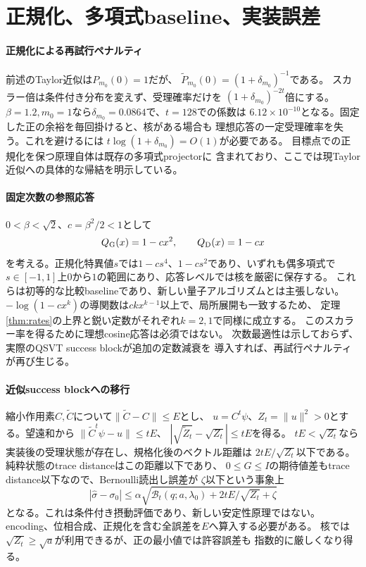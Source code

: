 \section{正規化、多項式baseline、実装誤差}\label{sec:normalization}
\paragraph{正規化による再試行ペナルティ}
前述のTaylor近似は$P_{m_0}(0)=1$だが、
$\widetilde P_{m_0}(0)=(1+\delta_{m_0})^{-1}$である。
スカラー倍は条件付き分布を変えず、受理確率だけを
$(1+\delta_{m_0})^{-2t}$倍にする。
$\beta=1.2,m_0=1$なら$\delta_{m_0}=0.0864$で、$t=128$での係数は
$6.12\times10^{-10}$となる。固定した正の余裕を毎回掛けると、核がある場合も
理想応答の一定受理確率を失う。これを避けるには
$t\log(1+\delta_{m_0})=O(1)$が必要である。
目標点での正規化を保つ原理自体は既存の多項式projector\cite{LinTongFilter}に
含まれており、ここでは現Taylor近似への具体的な帰結を明示している。

\paragraph{固定次数の参照応答}
$0<\beta<\sqrt2$、$c=\beta^2/2<1$として
\[
 Q_{\rm G}(x)=1-cx^2,\qquad Q_{\rm D}(x)=1-cx
\]
を考える。正規化特異値$s$では$1-cs^4$、$1-cs^2$であり、いずれも偶多項式で
$s\in[-1,1]$上$0$から$1$の範囲にあり、応答レベルでは核を厳密に保存する。
これらは初等的な比較baselineであり、新しい量子アルゴリズムとは主張しない。
$-\log(1-cx^k)$の導関数は$ckx^{k-1}$以上で、局所展開も一致するため、
定理\ref{thm:rates}の上界と鋭い定数がそれぞれ$k=2,1$で同様に成立する。
このスカラー率を得るために理想cosine応答は必須ではない。
次数最適性は示しておらず、実際のQSVT success blockが追加の定数減衰を
導入すれば、再試行ペナルティが再び生じる。

\paragraph{近似success blockへの移行}
縮小作用素$C,\widetilde C$について$\|\widetilde C-C\|\leq E$とし、
$u=C^t\psi$、$Z_t=\|u\|^2>0$とする。望遠和から
$\|\widetilde C^t\psi-u\|\leq tE$、
$|\sqrt{\widetilde Z_t}-\sqrt{Z_t}|\leq tE$を得る。
$tE<\sqrt{Z_t}$なら実装後の受理状態が存在し、規格化後のベクトル距離は
$2tE/\sqrt{Z_t}$以下である。純粋状態のtrace distanceはこの距離以下であり、
$0\leq G\leq I$の期待値差もtrace distance以下なので、Bernoulli読出し誤差が
$\zeta$以下という事象上
\begin{equation}\label{eq:robust}
 |\widehat\sigma-\sigma_0|
 \leq\alpha\sqrt{\mathcal B_t(q;a,\lambda_0)+2tE/\sqrt{Z_t}+\zeta}
\end{equation}
となる。これは条件付き摂動評価であり、新しい安定性原理ではない。
encoding、位相合成、正規化を含む全誤差を$E$へ算入する必要がある。
核では$\sqrt{Z_t}\geq\sqrt a$が利用できるが、正の最小値では許容誤差も
指数的に厳しくなり得る。

